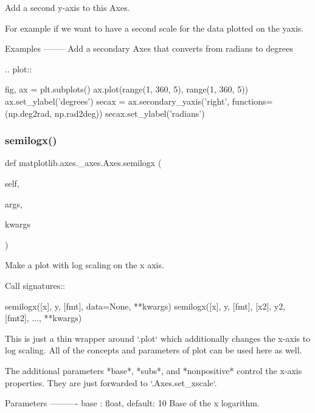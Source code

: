 \begin{DoxyVerb}
\begin{DoxyVerb}Add a second y-axis to this Axes.

For example if we want to have a second scale for the data plotted on
the yaxis.


Examples
--------
Add a secondary Axes that converts from radians to degrees

.. plot::

    fig, ax = plt.subplots()
    ax.plot(range(1, 360, 5), range(1, 360, 5))
    ax.set_ylabel('degrees')
    secax = ax.secondary_yaxis('right', functions=(np.deg2rad,
                                           np.rad2deg))
    secax.set_ylabel('radians')
\end{DoxyVerb}
 \mbox{\label{classmatplotlib_1_1axes_1_1__axes_1_1Axes_ae6af2a20a1540874f4b64c19e783b584}} 
\subsubsection{\texorpdfstring{semilogx()}{semilogx()}}
{\footnotesize\ttfamily def matplotlib.\+axes.\+\_\+axes.\+Axes.\+semilogx (\begin{DoxyParamCaption}\item[{}]{self,  }\item[{}]{args,  }\item[{}]{kwargs }\end{DoxyParamCaption})}

\begin{DoxyVerb}Make a plot with log scaling on the x axis.

Call signatures::

    semilogx([x], y, [fmt], data=None, **kwargs)
    semilogx([x], y, [fmt], [x2], y2, [fmt2], ..., **kwargs)

This is just a thin wrapper around `.plot` which additionally changes
the x-axis to log scaling. All of the concepts and parameters of plot
can be used here as well.

The additional parameters *base*, *subs*, and *nonpositive* control the
x-axis properties. They are just forwarded to `.Axes.set_xscale`.

Parameters
----------
base : float, default: 10
    Base of the x logarithm.


\end{DoxyVerb}
\end{DoxyVerb}
